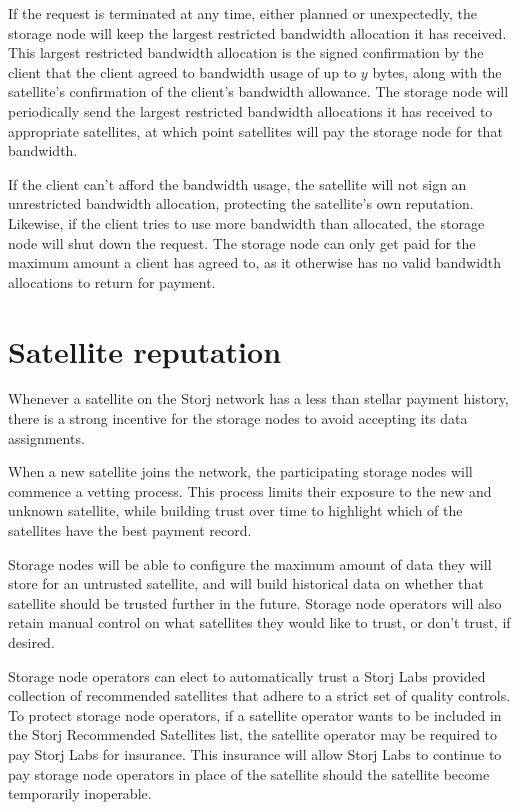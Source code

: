 \documentclass[11pt,fleqn,openany]{book}
\begin{document}
If the request is terminated at any time,
either planned or unexpectedly,
the storage node will keep the largest restricted bandwidth allocation it has
received.
This largest restricted bandwidth allocation is the signed confirmation
by the client that the client agreed to bandwidth usage of up to $y$
bytes, along with the satellite's confirmation of the client's bandwidth
allowance.
The storage node will periodically send the largest restricted bandwidth
allocations it has received to appropriate satellites, at which point
satellites will pay the storage node for that bandwidth.

If the client can't afford the bandwidth usage, the satellite will not sign an
unrestricted bandwidth allocation, protecting the satellite's own reputation.
Likewise, if the client tries to use more bandwidth than allocated,
the storage node will shut down the request.
The storage node can only get paid for the maximum amount a client has agreed
to,
as it otherwise has no valid bandwidth allocations to return for
payment.

\section{Satellite reputation}

Whenever a satellite on the Storj network has a less than stellar payment history,
there is a strong incentive for the storage nodes to avoid accepting its data
assignments.

When a new satellite joins the network, the participating storage nodes will
commence a vetting process. This process limits their exposure to the new and unknown
satellite, while building trust over time to highlight which of the
satellites have the best payment record.

Storage nodes will be able to configure the maximum amount of data they will
store for an untrusted satellite, and will build historical data on whether
that satellite should be trusted further in the future.
Storage node operators will also retain manual control on what satellites they
would like to trust, or don't trust, if desired.

Storage node operators can elect to automatically trust a Storj Labs
provided collection of recommended satellites that adhere to a strict set of
quality controls.
To protect storage node operators, if a satellite operator wants to be
included in the Storj Recommended Satellites list, the satellite operator may
be required to pay Storj Labs for insurance. This insurance will allow Storj
Labs to continue to pay storage node operators in place of the satellite should
the satellite become temporarily inoperable.
\end{document}
